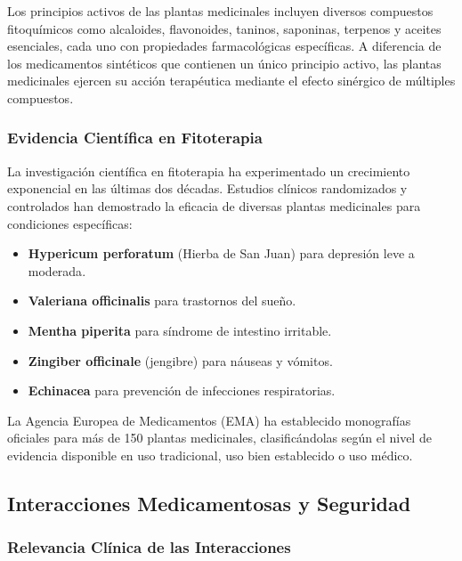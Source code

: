 \documentclass[12pt,a4paper]{article}
\begin{document}
Los principios activos de las plantas medicinales incluyen diversos compuestos fitoquímicos como alcaloides, flavonoides, taninos, saponinas, terpenos y aceites esenciales, cada uno con propiedades farmacológicas específicas\cite{Rates2001}. A diferencia de los medicamentos sintéticos que contienen un único principio activo, las plantas medicinales ejercen su acción terapéutica mediante el efecto sinérgico de múltiples compuestos\cite{Wagner2011}.

\subsubsection{Evidencia Científica en Fitoterapia}

La investigación científica en fitoterapia ha experimentado un crecimiento exponencial en las últimas dos décadas. Estudios clínicos randomizados y controlados han demostrado la eficacia de diversas plantas medicinales para condiciones específicas:

\begin{itemize}
    \item \textbf{Hypericum perforatum} (Hierba de San Juan) para depresión leve a moderada\cite{Linde2008}.
    \item \textbf{Valeriana officinalis} para trastornos del sueño\cite{Fernandez2004}.
    \item \textbf{Mentha piperita} para síndrome de intestino irritable\cite{Khanna2014}.
    \item \textbf{Zingiber officinale} (jengibre) para náuseas y vómitos\cite{Marx2015}.
    \item \textbf{Echinacea} para prevención de infecciones respiratorias\cite{Karsch2015}.
\end{itemize}

La Agencia Europea de Medicamentos (EMA) ha establecido monografías oficiales para más de 150 plantas medicinales, clasificándolas según el nivel de evidencia disponible en uso tradicional, uso bien establecido o uso médico\cite{EMA2018}.

\subsection{Interacciones Medicamentosas y Seguridad}

\subsubsection{Relevancia Clínica de las Interacciones}
\end{document}
